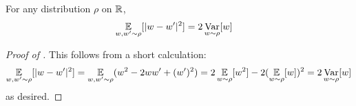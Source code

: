 \begin{proposition} \label{prop:variance_difference_form}
For any distribution $\rho$ on $\mathbb{R}$,
\begin{align}
\operatorname*{\mathbb{E}}_{w, w' \sim \rho} [|w - w'|^2]
& = 2 \operatorname*{Var}_{w \sim \rho}[w]
\end{align}
\end{proposition}
\begin{proof}[Proof of ]
This follows from a short calculation:
\begin{align}
\operatorname*{\mathbb{E}}_{w, w' \sim \rho} [|w - w'|^2]
 = \operatorname*{\mathbb{E}}_{w, w' \sim \rho} (w^2 - 2 w w' + (w')^2) 
 = 2 \operatorname*{\mathbb{E}}_{w \sim \rho} [w^2] - 2 (\operatorname*{\mathbb{E}}_{w \sim \rho}[w])^2 
 = 2 \operatorname*{Var}_{w \sim \rho}[w]
\end{align}
as desired.
\end{proof}